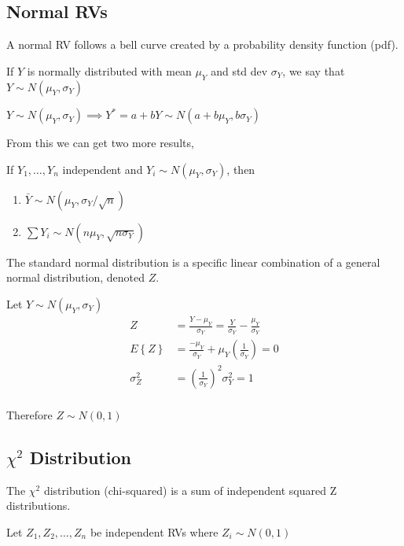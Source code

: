 \documentclass[10pt]{article}
\newcommand{\define}[1]{\colorbox{Thistle2}{#1}}
\newcommand{\emphas}[1]{\colorbox{DarkSeaGreen2}{#1}}
\newcommand{\mean}[1]{\mu_{#1}}
\renewcommand{\exp}[1]{E\left\{#1\right\}} %
\newcommand{\sigvar}[1]{\sigma^2_{#1}} %
\newcommand{\sigdev}[1]{\sigma_{#1}}
\begin{document}
\begin{multicols}{3}
    \subsection{Normal RVs}

    A normal RV follows a bell curve created by a \emphas{probability density function (pdf)}.

    If $Y$ is normally distributed with mean $\mean{Y}$ and std dev $\sigdev{Y}$, we say that $Y \sim N(\mean{Y}, \sigdev{Y})$

    $Y \sim N(\mean{Y}, \sigdev{Y}) \implies Y^* = a + bY \sim N(a + b\mean{Y}, b\sigdev{Y})$

    From this we can get two more results,

    If $Y_1, \dots, Y_n$ independent and $Y_i \sim N(\mean{Y}, \sigdev{Y})$, then

    \begin{enumerate}
        \item $\bar Y \sim N(\mean{Y}, \sigdev{Y}/\sqrt{n})$
        \item $\sum Y_i \sim N(n \mean{Y}, \sqrt{n \sigdev{Y}})$
    \end{enumerate}

    The \define{standard normal distribution} is a specific linear combination of a general normal distribution, denoted $Z$.

    Let $Y \sim N(\mean{Y}, \sigdev{Y})$
    \begin{align*}
        Z          & = \frac{Y - \mean{Y}}{\sigdev{Y}} = \frac{Y}{\sigdev{Y}} - \frac{\mean{Y}}{\sigdev{Y}} \\
        \exp{Z}    & = \frac{-\mean{Y}}{\sigdev{Y}} + \mean{Y} (\frac{1}{\sigdev{Y}}) = 0                   \\
        \sigvar{Z} & = \left(\frac{1}{\sigdev{Y}}\right)^2 \sigvar{Y} = 1                                   \\
    \end{align*}

    Therefore $Z \sim N(0,1)$

    \subsection{\texorpdfstring{$\chi^2$}{chi2} Distribution}

    The \define{$\chi^2$ distribution} (chi-squared) is a sum of independent squared Z distributions.

    Let $Z_1, Z_2, \dots, Z_n$ be independent RVs where $Z_i \sim N(0,1)$


\end{multicols}
\end{document}
